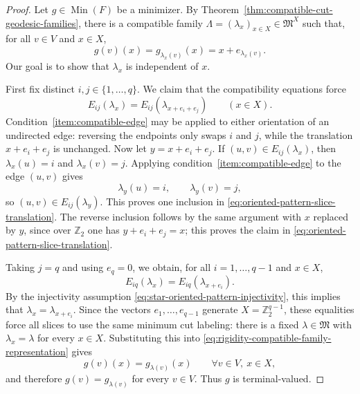\documentclass[11pt,oneside,letterpaper]{article}
\numberwithin{equation}{section}
\theoremstyle{definition}
\theoremstyle{remark}
\begin{document}
\begin{proof}
Let $g\in\operatorname{Min}(F)$ be a minimizer.  By Theorem~\ref{thm:compatible-cut-geodesic-families}, there is a compatible family $\Lambda=(\lambda_x)_{x\in X}\in\mathfrak{M}^X$ such that, for all $v \in V$ and $x \in X$,
\begin{equation}\label{eq:rigidity-compatible-family-representation}
  g(v)(x)=g_{\lambda_x(v)}(x)=x+e_{\lambda_x(v)}.
\end{equation}
Our goal is to show that $\lambda_x$ is independent of $x$.

First fix distinct $i,j\in\{1,\ldots,q\}$.  We claim that the compatibility equations force
\begin{equation}\label{eq:oriented-pattern-slice-translation}
  E_{ij}(\lambda_x)=E_{ij}(\lambda_{x+e_i+e_j})
  \qquad (x\in X).
\end{equation}
Condition~\ref{item:compatible-edge} may be applied to either
orientation of an undirected edge: reversing the endpoints only swaps
$i$ and $j$, while the translation $x+e_i+e_j$ is unchanged.  Now let
$y=x+e_i+e_j$.  If $(u,v)\in E_{ij}(\lambda_x)$, then $\lambda_x(u)=i$ and $\lambda_x(v)=j$. Applying condition~\ref{item:compatible-edge} to the edge $(u,v)$ gives
\begin{equation}
  \lambda_y(u)=i,\qquad \lambda_y(v)=j,
\end{equation}
so $(u,v)\in E_{ij}(\lambda_y)$.  This proves one inclusion in
\eqref{eq:oriented-pattern-slice-translation}.  The reverse inclusion
follows by the same argument with $x$ replaced by $y$, since over $\mathbb{Z}_2$ one has $y+e_i+e_j=x$; this proves the claim in \eqref{eq:oriented-pattern-slice-translation}.

Taking $j=q$ and using $e_q=0$, we obtain, for all $i=1,\ldots,q-1$ and $x\in X$,
\begin{equation}
  E_{iq}(\lambda_x)=E_{iq}(\lambda_{x+e_i}).
\end{equation}
By the injectivity assumption \eqref{eq:star-oriented-pattern-injectivity}, this implies that $\lambda_x=\lambda_{x+e_i}$. Since the vectors $e_1,\ldots,e_{q-1}$ generate $X=\mathbb{Z}_2^{q-1}$, these equalities force all slices to use the same minimum cut labeling: there is a fixed $\lambda\in\mathfrak{M}$ with $\lambda_x=\lambda$ for every $x\in X$. Substituting this into
\eqref{eq:rigidity-compatible-family-representation} gives
\begin{equation}
  g(v)(x)=g_{\lambda(v)}(x)
  \qquad  \forall v\in V,\ x\in X,
\end{equation}
and therefore $g(v)=g_{\lambda(v)}$ for every $v\in V$.  Thus $g$ is
terminal-valued.
\end{proof}
\end{document}
